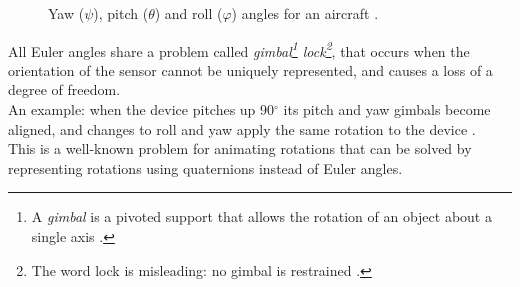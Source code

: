 \begin{center}
	\begin{figure}[ht]
		\caption{Yaw ($\psi$), pitch ($\theta$) and roll ($\varphi$) angles for an aircraft \cite{WikimediaPlane}.}
	\end{figure}
\end{center}

All Euler angles share a problem called \textit{gimbal\footnote{A \textit{gimbal} is a pivoted support that allows the rotation of an object about a single axis \cite{WikipediaGimbal}.} lock\footnote{The word lock is misleading: no gimbal is restrained \cite{WikipediaGimbalLock}.}}, that occurs when the orientation of the sensor cannot be uniquely represented, and causes a loss of a degree of freedom.\\
An example: when the device pitches up 90$^{\circ}$ its pitch and yaw gimbals become aligned, and changes to roll and yaw apply the same rotation to the device \cite{Tit04}.\\
This is a well-known problem for animating rotations that can be solved by representing rotations using quaternions instead of Euler angles.

